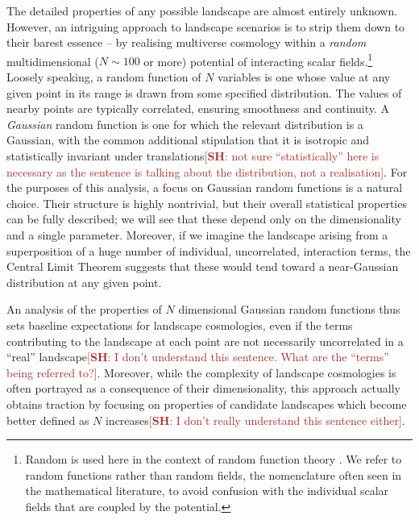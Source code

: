 \documentclass[12pt]{article}
\newcommand{\SH}[1]{\textcolor{brown}{[{\bf SH}: #1]}}
\begin{document}
The detailed properties of any possible landscape are almost entirely unknown.  However, an intriguing approach to landscape scenarios is to strip them down to their barest essence -- by realising multiverse cosmology within a {\em random\/} multidimensional ($N\sim100$ or more) potential of interacting scalar fields.\footnote{Random is used here in the  context of random function theory \cite{GRF1, GRF2, GRF3}.  We refer to random functions rather than random fields, the nomenclature often seen in the mathematical literature, to avoid confusion with the individual scalar fields that are coupled by the potential.} Loosely speaking, a random function of $N$ variables is one whose value at any given point in its range is drawn from some specified distribution. The values of nearby points are typically correlated, ensuring smoothness and continuity. A {\em Gaussian\/} random function is one for which the relevant distribution is a Gaussian, with the common additional stipulation that it is isotropic and statistically invariant under translations\SH{not sure ``statistically'' here is necessary as the sentence is talking about the distribution, not a realisation}. For the purposes of this analysis, a focus on Gaussian random functions is a natural choice. Their structure is highly nontrivial, but their overall statistical properties can be fully described; we will see that these depend only on the dimensionality and a single parameter. Moreover, if we imagine the landscape arising from a superposition of a huge number of individual, uncorrelated, interaction terms, the Central Limit Theorem suggests that these would tend toward a near-Gaussian distribution at any given point.

An analysis of the properties of $N$ dimensional Gaussian random functions  thus sets baseline expectations for landscape cosmologies, even if the terms contributing to the landscape at each point are not necessarily uncorrelated in a ``real'' landscape\SH{I don't understand this sentence. What are the ``terms'' being referred to?}. Moreover, while the complexity of landscape cosmologies is often portrayed as a consequence of their dimensionality, this approach actually obtains traction by focusing on properties of candidate landscapes which become better defined as $N$ increases\SH{I don't really understand this sentence either}. 
 
\end{document}
